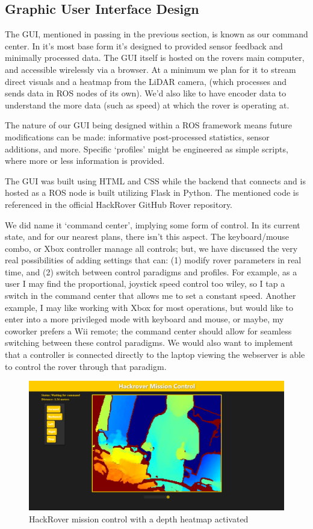\documentclass[a4paper, 10pt]{article}
\begin{document}
	\subsection{Graphic User Interface Design}
	The GUI, mentioned in passing in the previous section, is known as our command center. In it's most base form it's designed to provided sensor feedback and minimally processed data. The GUI itself is hosted on the rovers main computer, and accessible wirelessly via a browser. At a minimum we plan for it to stream direct visuals and a heatmap from the LiDAR camera, (which processes and sends data in ROS nodes of its own). We'd also like to have encoder data to understand the more data (such as speed) at which the rover is operating at.
	
	The nature of our GUI being designed within a ROS framework means future modifications can be made: informative post-processed statistics, sensor additions, and more. Specific `profiles' might be engineered as simple scripts, where more or less information is provided.

    The GUI was built using HTML and CSS while the backend that connects and is hosted as a ROS node is built utilizing Flask in Python. The mentioned code is referenced in the official HackRover GitHub Rover repository. 
	
	We did name it `command center', implying some form of control. In its current state, and for our nearest plans, there isn't this aspect. The keyboard/mouse combo, or Xbox controller manage all controls; but, we have discussed the very real possibilities of adding settings that can: (1) modify rover parameters in real time, and (2) switch between control paradigms and profiles. For example, as a user I may find the proportional, joystick speed control too wiley, so I tap a switch in the command center that allows me to set a constant speed. Another example, I may like working with Xbox for most operations, but would like to enter into a more privileged mode with keyboard and mouse, or maybe, my coworker prefers a Wii remote; the command center should allow for seamless switching between these control paradigms. We would also want to implement that a controller is connected directly to the laptop viewing the webserver is able to control the rover through that paradigm. 

	\begin{figure} [!h]
			\centering
			\includegraphics[scale=0.25]{Photos/hackrover mission control}
			\caption{HackRover mission control with a depth heatmap activated}
			\label{mission_control}
	\end{figure}
\end{document}

